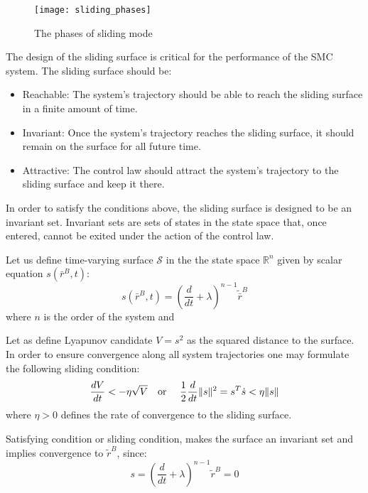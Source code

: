     \begin{figure}[H]
        \centering\texttt{[image: sliding\_phases]}
        \caption{The phases of sliding mode}
        \label{image:sliding_phases}
    \end{figure}

    The design of the sliding surface is critical for the performance of the SMC
    system. The sliding surface should be:
    \begin{itemize}
        \item Reachable: The system's trajectory should be able to reach the sliding
            surface in a finite amount of time.
        \item Invariant: Once the system's trajectory reaches the sliding surface, it
            should remain on the surface for all future time.
        \item Attractive: The control law should attract the system's trajectory to the
            sliding surface and keep it there.
    \end{itemize}

    In order to satisfy the conditions above, the sliding surface is designed to be an invariant set.
    Invariant sets are sets of states in the state space that, once entered, cannot be exited under 
    the action of the control law.

    Let us define time-varying surface $\mathcal{S}$ in the the state space $\mathbb{R}^n$
    given by scalar equation $s(\bar{r}^B, t)$:
    $$
        s(\bar{r}^B, t) = (\frac{d}{dt} + \lambda)^{n-1}\tilde{\bar{r}}^B
    $$
    where $n$ is the order of the system and 

    Let as define Lyapunov candidate $V = s^2$ as the squared distance to the surface.
    In order to ensure convergence along all system trajectories one may
    formulate the following sliding condition:
    $$
    \frac{dV}{dt} < -\eta \sqrt{V} \text{\quad or \quad}
    \frac{1}{2}\frac{d}{dt}\|s\|^2 = s^T\dot{s} < \eta \|s\|
    $$
    where $\eta>0$ defines the rate of convergence to the sliding surface.


    Satisfying condition or sliding condition, makes the surface an invariant set
    and implies convergence to $\tilde{r}^B$, since:
    $$
        s = (\frac{d}{dt} + \lambda)^{n-1}\tilde r^B = 0
    $$

